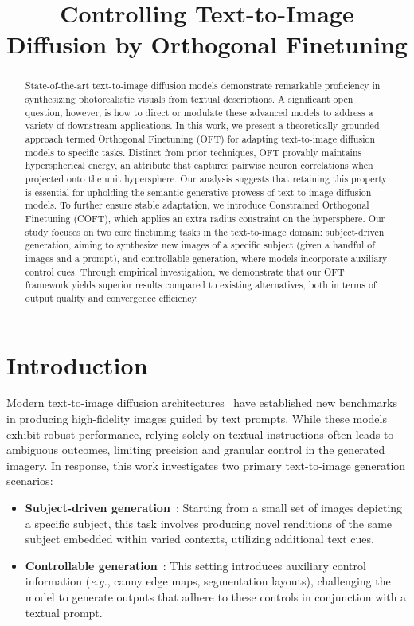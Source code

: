\title{Controlling Text-to-Image Diffusion by Orthogonal Finetuning}

\begin{abstract}
State-of-the-art text-to-image diffusion models demonstrate remarkable proficiency in synthesizing photorealistic visuals from textual descriptions. A significant open question, however, is how to direct or modulate these advanced models to address a variety of downstream applications. In this work, we present a theoretically grounded approach termed Orthogonal Finetuning (OFT) for adapting text-to-image diffusion models to specific tasks. Distinct from prior techniques, OFT provably maintains hyperspherical energy, an attribute that captures pairwise neuron correlations when projected onto the unit hypersphere. Our analysis suggests that retaining this property is essential for upholding the semantic generative prowess of text-to-image diffusion models. To further ensure stable adaptation, we introduce Constrained Orthogonal Finetuning (COFT), which applies an extra radius constraint on the hypersphere. Our study focuses on two core finetuning tasks in the text-to-image domain: subject-driven generation, aiming to synthesize new images of a specific subject (given a handful of images and a prompt), and controllable generation, where models incorporate auxiliary control cues. Through empirical investigation, we demonstrate that our OFT framework yields superior results compared to existing alternatives, both in terms of output quality and convergence efficiency.
\end{abstract}

\section{Introduction}

Modern text-to-image diffusion architectures~\cite{saharia2022photorealistic,ramesh2022hierarchical,rombach2022high} have established new benchmarks in producing high-fidelity images guided by text prompts. While these models exhibit robust performance, relying solely on textual instructions often leads to ambiguous outcomes, limiting precision and granular control in the generated imagery. In response, this work investigates two primary text-to-image generation scenarios:

\begin{itemize}[leftmargin=*,nosep]

    \item \textbf{Subject-driven generation}~\cite{ruiz2023dreambooth}: Starting from a small set of images depicting a specific subject, this task involves producing novel renditions of the same subject embedded within varied contexts, utilizing additional text cues.
    \item \textbf{Controllable generation}~\cite{zhang2023adding,mou2023t2i}: This setting introduces auxiliary control information (\emph{e.g.}, canny edge maps, segmentation layouts), challenging the model to generate outputs that adhere to these controls in conjunction with a textual prompt.
\end{itemize}

